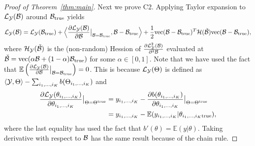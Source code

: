 \documentclass[12pt]{article}
\theoremstyle{definition}
\theoremstyle{definition}
\begin{document}
\begin{proof}[Proof of Theorem~\ref{thm:main}]
Next we prove C2. Applying Taylor expansion to $\mathcal{L}_{\mathcal{Y}}(\mathcal{B})$ around $\mathcal{B}_{\textup{true}}$ yields
\begin{equation}\label{eq:logbefore}
\mathcal{L}_{\mathcal{Y}}(\mathcal{B})=\mathcal{L}_{\mathcal{Y}}(\mathcal{B}_{\textup{true}})+\Big\langle {\partial\mathcal{L}_{\mathcal{Y}}(\mathcal{B}) \over \partial
\mathcal{B}}\big|_{\mathcal{B}=\mathcal{B}_{\textup{true}}},\mathcal{B}-\mathcal{B}_{\textup{true}} \Big\rangle + {1\over 2}\text{vec}(\mathcal{B}-\mathcal{B}_{\textup{true}})^T \mathcal{H}(\check {\mathcal{B}})\text{vec}(\mathcal{B}-\mathcal{B}_{\textup{true}}),
\end{equation}
where $\mathcal{H}_{\mathcal{Y}}(\check {\mathcal{B}})$ is the (non-random) Hession of ${\partial \mathcal{L}_{\mathcal{Y}}^2 (\mathcal{B})\over\partial^2 \mathcal{B}}$ evaluated at $\check {\mathcal{B}} = \text{vec}(\alpha \mathcal{B}+(1-\alpha)\mathcal{B}_{\textup{true}})$ for some $\alpha\in[0,1]$. Note that we have used the fact that $\mathbb{E}\left({\partial\mathcal{L}_{\mathcal{Y}}(\mathcal{B}) \over \partial \mathcal{B}}\big|_{\mathcal{B}=\mathcal{B}_{\textup{true}}}\right)=0$. This is because $\mathcal{L}_{\mathcal{Y}}(\Theta) $ is defined as $\langle \mathcal{Y},\Theta\rangle - \sum_{i_1,\ldots,i_K}b(\Theta_{i_1,\ldots,i_K})$ and
\begin{align}
{\partial \mathcal{L}_{\mathcal{Y}}(\theta_{i_1,\ldots,i_K})\over \partial \theta_{i_1,\ldots,i_K}}\big|_{\Theta=\Theta^{\text{true}}}& = y_{i_1,\ldots,i_K} - {\partial b(\theta_{i_1,\ldots,i_K})\over\partial \theta_{i_1,\ldots,i_K}}\big|_{\Theta=\Theta^{\text{true}}} \\
&= y_{i_1,\ldots,i_K} - \mathbb{E}(y_{i_1,\ldots,i_K}|\theta_{i_1,\ldots,i_K\text{true}}),
\end{align}
where the last equality has used the fact that $b'(\theta) = \mathbb{E}(y|\theta)$. Taking derivative with respect to $\mathcal{B}$ has the same result because of the chain rule.


\end{proof}
\end{document}
